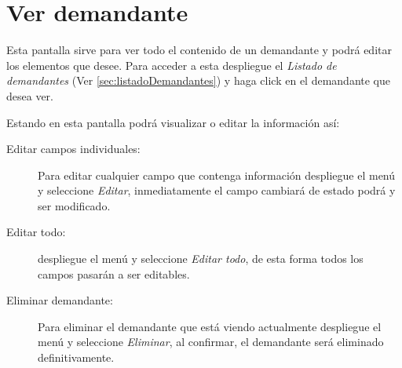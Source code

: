 \section{Ver demandante}
\label{sec:verDemandante}
Esta pantalla sirve para ver todo el contenido de un demandante y
podr\'a editar los elementos que desee. Para acceder a esta
despliegue el \emph{Listado de demandantes}
(Ver \ref{sec:listadoDemandantes}) y haga click en el demandante que
desea ver.

Estando en esta pantalla podr\'a visualizar o editar la informaci\'on as\'i:

\begin{description}
\item[Editar campos individuales:]Para editar cualquier campo que contenga
informaci\'on despliegue el men\'u \blackberry y seleccione \emph{Editar},
inmediatamente el campo
cambiar\'a de estado podr\'a y ser modificado.
\item[Editar todo:]despliegue el men\'u \blackberry y seleccione \emph{Editar todo},
de esta forma todos los campos pasar\'an a ser editables.
\item[Eliminar demandante:]Para eliminar el demandante que
est\'a viendo actualmente despliegue el men\'u \blackberry y
seleccione \emph{Eliminar}, al confirmar, el demandante ser\'a
eliminado definitivamente.
\end{description}

\guardarVer
